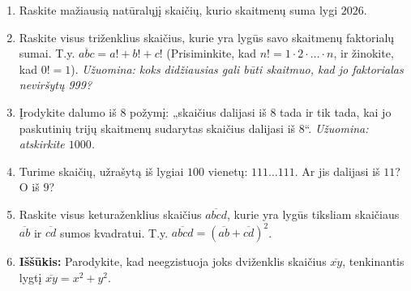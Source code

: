 \documentclass[11pt,a4paper]{scrartcl}
\begin{document}
\begin{enumerate}
    \item Raskite mažiausią natūralųjį skaičių, kurio skaitmenų suma lygi $2026$.
    \item Raskite visus triženklius skaičius, kurie yra lygūs savo skaitmenų faktorialų sumai. T.y. $\overline{abc} = a! + b! + c!$ (Prisiminkite, kad $n! = 1 \cdot 2 \cdot \ldots \cdot n$, ir žinokite, kad $0! = 1$). \textit{Užuomina: koks didžiausias gali būti skaitmuo, kad jo faktorialas neviršytų 999?}
    \item Įrodykite dalumo iš $8$ požymį: „skaičius dalijasi iš $8$ tada ir tik tada, kai jo paskutinių trijų skaitmenų sudarytas skaičius dalijasi iš $8$“. \textit{Užuomina: atskirkite $1000$.}
    \item Turime skaičių, užrašytą iš lygiai $100$ vienetų: $111\dots111$. Ar jis dalijasi iš $11$? O iš $9$?
    \item Raskite visus keturaženklius skaičius $\overline{abcd}$, kurie yra lygūs tiksliam skaičiaus $\overline{ab}$ ir $\overline{cd}$ sumos kvadratui. T.y. $\overline{abcd} = (\overline{ab} + \overline{cd})^2$.
    \item \textbf{Iššūkis:} Parodykite, kad neegzistuoja joks dviženklis skaičius $\overline{xy}$, tenkinantis lygtį $\overline{xy} = x^2 + y^2$.
\end{enumerate}
\end{document}
